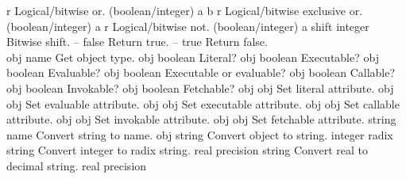 \begin{longtable}{}
	{r}
	{Logical/bitwise or. (boolean/integer)}
\hline
\optableent
	{a b}
	{{\bf {}}}
	{r}
	{Logical/bitwise exclusive or. (boolean/integer)}
\hline
\optableent
	{a}
	{{\bf {}}}
	{r}
	{Logical/bitwise not. (boolean/integer)}
\hline
\optableent
	{a shift}
	{{\bf {}}}
	{integer}
	{Bitwise shift.}
\hline
\optableent
	{--}
	{{\bf {}}}
	{false}
	{Return true.}
\hline
\optableent
	{--}
	{{\bf {}}}
	{true}
	{Return false.}
\hline \hline
{} \\
\hline \hline
\optableent
	{obj}
	{{\bf {}}}
	{name}
	{Get object type.}
\hline
\optableent
	{obj}
	{{\bf {}}}
	{boolean}
	{Literal?}
\hline
\optableent
	{obj}
	{{\bf {}}}
	{boolean}
	{Executable?}
\hline
\optableent
	{obj}
	{{\bf {}}}
	{boolean}
	{Evaluable?}
\hline
\optableent
	{obj}
	{{\bf {}}}
	{boolean}
	{Executable or evaluable?}
\hline
\optableent
	{obj}
	{{\bf {}}}
	{boolean}
	{Callable?}
\hline
\optableent
	{obj}
	{{\bf {}}}
	{boolean}
	{Invokable?}
\hline
\optableent
	{obj}
	{{\bf {}}}
	{boolean}
	{Fetchable?}
\hline
\optableent
	{obj}
	{{\bf {}}}
	{obj}
	{Set literal attribute.}
\hline
\optableent
	{obj}
	{{\bf {}}}
	{obj}
	{Set evaluable attribute.}
\hline
\optableent
	{obj}
	{{\bf {}}}
	{obj}
	{Set executable attribute.}
\hline
\optableent
	{obj}
	{{\bf {}}}
	{obj}
	{Set callable attribute.}
\hline
\optableent
	{obj}
	{{\bf {}}}
	{obj}
	{Set invokable attribute.}
\hline
\optableent
	{obj}
	{{\bf {}}}
	{obj}
	{Set fetchable attribute.}
\hline
\optableent
	{string}
	{{\bf {}}}
	{name}
	{Convert string to name.}
\hline
\optableent
	{obj}
	{{\bf {}}}
	{string}
	{Convert object to string.}
\hline
\optableent
	{integer radix}
	{{\bf {}}}
	{string}
	{Convert integer to radix string.}
\hline
\optableent
	{real precision}
	{{\bf {}}}
	{string}
	{Convert real to decimal string.}
\hline
\optableent
	{real precision}
	{{\bf {}}}

\end{longtable}
